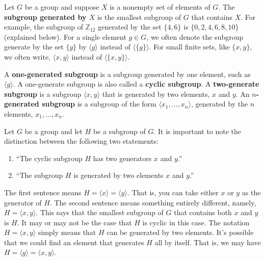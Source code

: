 \documentclass[12pt]{article}
\newcommand{\Z} {{\mathbb Z}}
\newcommand{\<}{\ensuremath{\langle}}
\renewcommand{\>}{\ensuremath{\rangle}}
\theoremstyle{plain}
\theoremstyle{definition}
\begin{document}
Let $G$ be a group and suppose $X$ is a nonempty set of elements of $G$.
The {\bf subgroup generated by $X$} is the smallest subgroup of $G$ that
contains $X$.  
For example, the subgroup of $\Z_{12}$ generated by the set $\{4, 6\}$ is 
$\{0, 2, 4, 6, 8, 10\}$ (explained below).
For a single element $g \in G$, we often denote the subgroup generate
by the set $\{g\}$ by $\<g\>$ instead of $\<\{g\}\>$.  
For small finite sets, like $\{x, y\}$, we often write, 
$\<x, y\>$ instead of $\<\{x, y\}\>$.

A {\bf one-generated subgroup} is a subgroup generated by one
element, such as $\<g\>$.  A one-generate subgroup is also called a {\bf cyclic
subgroup}.  A {\bf two-generate subgroup} is a
subgroup $\<x, y\>$ that is generated by two elements, $x$ and $y$.
An {\bf $n$-generated subgroup} is a
subgroup of the form $\<x_1, \dots, x_n\>$, generated by the $n$ elements,
$x_1, \dots, x_n$.

Let $G$ be a group and let $H$ be a subgroup of $G$.
It is important to note the distinction between the following two statements:
\begin{enumerate}
\item ``The cyclic subgroup $H$ has two generators $x$ and $y$.''
\item ``The subgroup $H$ is generated by two elements $x$ and $y$.''
\end{enumerate}
The first sentence means $H = \<x\> = \<y\>$.  That is, you can take either $x$
or $y$ as the generator of $H$.  
The second sentence means something entirely different, namely, $H = \<x, y\>$.
This says that the smallest subgroup of $G$ that contains both $x$ and $y$ is
$H$.  It may or may not be the case that $H$ is cyclic in this case.  The
notation $H = \<x, y\>$ simply means that $H$ can be generated by two elements.
It's possible that we could find an element that generates $H$ all by itself.
That is, we may have $H = \<g\> = \<x, y\>$.  

\bigskip
\end{document}
